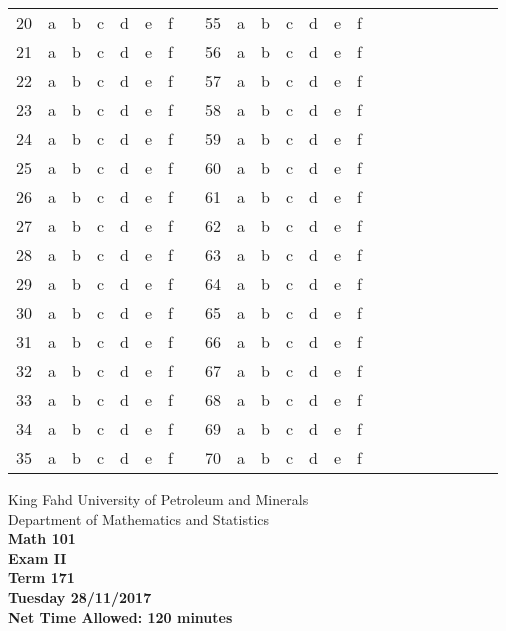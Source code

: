 \documentclass[amsfonts,bezier,leqno,fleqn,12pt,a4paper]{article}
\begin{document}
{{{\begin{normalsize}
\begin{center}
\begin{tabular}{|c|c c c c c c|c|c|c c c c c c|c|c|c c c c c c|}
20 & a & b & c & d & e & f & & 55& a & b & c & d & e & f\\ \cline{1-7}\cline{9-15}
21 & a & b & c & d & e & f & & 56& a & b & c & d & e & f\\ \cline{1-7}\cline{9-15}
22 & a & b & c & d & e & f & & 57& a & b & c & d & e & f\\ \cline{1-7}\cline{9-15}
23 & a & b & c & d & e & f & & 58& a & b & c & d & e & f\\ \cline{1-7}\cline{9-15}
24 & a & b & c & d & e & f & & 59& a & b & c & d & e & f\\ \cline{1-7}\cline{9-15}
25 & a & b & c & d & e & f & & 60& a & b & c & d & e & f\\ \cline{1-7}\cline{9-15}
26 & a & b & c & d & e & f & & 61& a & b & c & d & e & f\\ \cline{1-7}\cline{9-15}
27 & a & b & c & d & e & f & & 62& a & b & c & d & e & f\\ \cline{1-7}\cline{9-15}
28 & a & b & c & d & e & f & & 63& a & b & c & d & e & f\\ \cline{1-7}\cline{9-15}
29 & a & b & c & d & e & f & & 64& a & b & c & d & e & f\\ \cline{1-7}\cline{9-15}
30 & a & b & c & d & e & f & & 65& a & b & c & d & e & f\\ \cline{1-7}\cline{9-15}
31 & a & b & c & d & e & f & & 66& a & b & c & d & e & f\\ \cline{1-7}\cline{9-15}
32 & a & b & c & d & e & f & & 67& a & b & c & d & e & f\\ \cline{1-7}\cline{9-15}
33 & a & b & c & d & e & f & & 68& a & b & c & d & e & f\\ \cline{1-7}\cline{9-15}
34 & a & b & c & d & e & f & & 69& a & b & c & d & e & f\\ \cline{1-7}\cline{9-15}
35 & a & b & c & d & e & f & & 70& a & b & c & d & e & f\\ \cline{1-7}\cline{9-15}
\end{tabular}\end{center}
\end{normalsize}
\newpage
\thispagestyle{empty}

\begin{center}
\begin{large}

King Fahd University of Petroleum and Minerals\\
Department of Mathematics and Statistics\\
\vspace*{0.5cm}
{\bf {}} \hfill {\bf Math 101} \hfill {\bf {}} \\
{\bf Exam II}  \\
{\bf Term 171}  \\
{\bf Tuesday 28/11/2017}  \\
{\bf Net Time Allowed: 120 minutes}  \\
\vspace*{0.2cm}


\end{large}
\end{center}}}}
\end{document}

